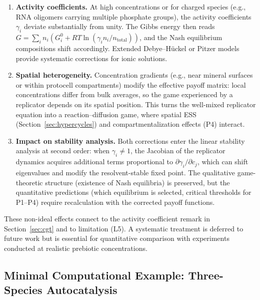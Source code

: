 \documentclass[12pt,a4paper]{article}
\theoremstyle{remark}
\begin{document}
\begin{enumerate}
    \item \textbf{Activity coefficients.} At high concentrations or for charged species (e.g., RNA oligomers carrying multiple phosphate groups), the activity coefficients $\gamma_i$ deviate substantially from unity. The Gibbs energy then reads $G = \sum_i n_i (G_i^0 + RT\ln(\gamma_i n_i / n_{\mathrm{total}}))$, and the Nash equilibrium compositions shift accordingly. Extended Debye--Hückel or Pitzer models provide systematic corrections for ionic solutions.
    \item \textbf{Spatial heterogeneity.} Concentration gradients (e.g., near mineral surfaces or within protocell compartments) modify the effective payoff matrix: local concentrations differ from bulk averages, so the game experienced by a replicator depends on its spatial position. This turns the well-mixed replicator equation into a reaction--diffusion game, where spatial ESS (Section~\ref{sec:hypercycles}) and compartmentalization effects (P4) interact.
    \item \textbf{Impact on stability analysis.} Both corrections enter the linear stability analysis at second order: when $\gamma_i \neq 1$, the Jacobian of the replicator dynamics acquires additional terms proportional to $\partial\gamma_i/\partial c_j$, which can shift eigenvalues and modify the resolvent-stable fixed point. The qualitative game-theoretic structure (existence of Nash equilibria) is preserved, but the quantitative predictions (which equilibrium is selected, critical thresholds for P1--P4) require recalculation with the corrected payoff functions.
\end{enumerate}

\noindent
These non-ideal effects connect to the activity coefficient remark in Section~\ref{sec:cgt} and to limitation (L5). A systematic treatment is deferred to future work but is essential for quantitative comparison with experiments conducted at realistic prebiotic concentrations.

\subsection{Minimal Computational Example: Three-Species Autocatalysis}\label{sec:3species}
\end{document}
